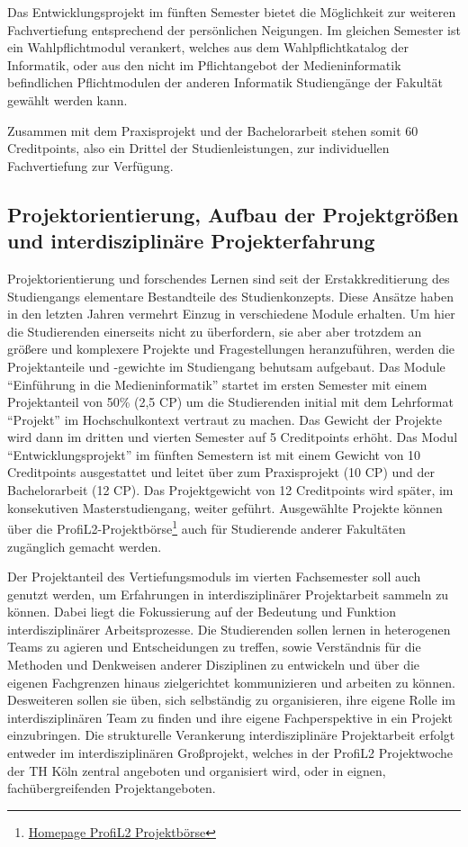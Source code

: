 Das Entwicklungsprojekt im fünften Semester bietet die Möglichkeit zur
weiteren Fachvertiefung entsprechend der persönlichen Neigungen. Im
gleichen Semester ist ein Wahlpflichtmodul verankert, welches aus dem
Wahlpflichtkatalog der Informatik, oder aus den nicht im Pflichtangebot
der Medieninformatik befindlichen Pflichtmodulen der anderen Informatik
Studiengänge der Fakultät gewählt werden kann.

Zusammen mit dem Praxisprojekt und der Bachelorarbeit stehen somit 60
Creditpoints, also ein Drittel der Studienleistungen, zur individuellen
Fachvertiefung zur Verfügung.

\subsection{Projektorientierung, Aufbau der Projektgrößen und
interdisziplinäre
Projekterfahrung}\label{projektorientierung-aufbau-der-projektgruxf6uxdfen-und-interdisziplinuxe4re-projekterfahrung}

Projektorientierung und forschendes Lernen sind seit der
Erstakkreditierung des Studiengangs elementare Bestandteile des
Studienkonzepts. Diese Ansätze haben in den letzten Jahren vermehrt
Einzug in verschiedene Module erhalten. Um hier die Studierenden
einerseits nicht zu überfordern, sie aber aber trotzdem an größere und
komplexere Projekte und Fragestellungen heranzuführen, werden die
Projektanteile und -gewichte im Studiengang behutsam aufgebaut. Das
Module ``Einführung in die Medieninformatik'' startet im ersten Semester
mit einem Projektanteil von 50\% (2,5 CP) um die Studierenden initial
mit dem Lehrformat ``Projekt'' im Hochschulkontext vertraut zu machen.
Das Gewicht der Projekte wird dann im dritten und vierten Semester auf 5
Creditpoints erhöht. Das Modul ``Entwicklungsprojekt'' im fünften
Semestern ist mit einem Gewicht von 10 Creditpoints ausgestattet und
leitet über zum Praxisprojekt (10 CP) und der Bachelorarbeit (12 CP).
Das Projektgewicht von 12 Creditpoints wird später, im konsekutiven
Masterstudiengang, weiter geführt. Ausgewählte Projekte können über die
ProfiL2-Projektbörse\footnote{\href{http://projektboerse-profil2.th-koeln.de/}{Homepage
  ProfiL2 Projektbörse}} auch für Studierende anderer Fakultäten
zugänglich gemacht werden.

Der Projektanteil des Vertiefungsmoduls im vierten Fachsemester soll
auch genutzt werden, um Erfahrungen in interdisziplinärer Projektarbeit
sammeln zu können. Dabei liegt die Fokussierung auf der Bedeutung und
Funktion interdisziplinärer Arbeitsprozesse. Die Studierenden sollen
lernen in heterogenen Teams zu agieren und Entscheidungen zu treffen,
sowie Verständnis für die Methoden und Denkweisen anderer Disziplinen zu
entwickeln und über die eigenen Fachgrenzen hinaus zielgerichtet
kommunizieren und arbeiten zu können. Desweiteren sollen sie üben, sich
selbständig zu organisieren, ihre eigene Rolle im interdisziplinären
Team zu finden und ihre eigene Fachperspektive in ein Projekt
einzubringen. Die strukturelle Verankerung interdisziplinäre
Projektarbeit erfolgt entweder im interdisziplinären Großprojekt,
welches in der ProfiL2 Projektwoche der TH Köln zentral angeboten und
organisiert wird, oder in eignen, fachübergreifenden Projektangeboten.

